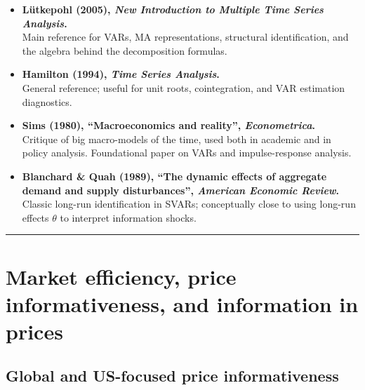 \documentclass[11pt,a4paper]{article}
\begin{document}
\begin{itemize}
  \item \textbf{L\"utkepohl (2005), \emph{New Introduction to Multiple Time Series Analysis}.}\\
  Main reference for VARs, MA representations, structural identification, and the algebra behind the decomposition formulas.

  \item \textbf{Hamilton (1994), \emph{Time Series Analysis}.}\\
  General reference; useful for unit roots, cointegration, and VAR estimation diagnostics.

  \item \textbf{Sims (1980), ``Macroeconomics and reality'', \emph{Econometrica}.}\\
  Critique of big macro-models of the time, used both in academic and in policy analysis. Foundational paper on VARs and impulse-response analysis.

  \item \textbf{Blanchard \& Quah (1989), ``The dynamic effects of aggregate demand and supply disturbances'', \emph{American Economic Review}.}\\
  Classic long-run identification in SVARs; conceptually close to using long-run effects \(\theta\) to interpret information shocks.
\end{itemize}

\bigskip
\hrule
\bigskip

\section{Market efficiency, price informativeness, and information in prices}

\subsection{Global and US-focused price informativeness}
\end{document}
